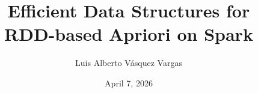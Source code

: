 
\def\MyTitle{Efficient Data Structures for \\ \small RDD-based Apriori on Spark}
\def\MyShortTitle{Apriori on Spark}
\def\MyAuthor{Luis Alberto Vásquez Vargas}
\def\MyShortAuthor{Luis Vásquez}
\def\MyInstitute{IC -- UNICAMP}
\def\MyEmail{l322989@dac.unicamp.br}
\def\MyDate{April 7, 2026}

\title[\MyShortTitle]{\MyTitle}
\author[\MyShortAuthor]{\MyAuthor}
\institute{\MyInstitute}
\date{\MyDate}

\usepackage[english]{babel}
\usepackage[utf8]{inputenc}
\usepackage[T1]{fontenc}
\usepackage{beramono}
\usepackage{amsmath, amsfonts, amssymb}
\usepackage{chemfig}
\usepackage[version=3]{mhchem}
\usepackage{tikz}
\usetikzlibrary{positioning, arrows.meta}
\usepackage{fontawesome}
\usepackage{booktabs}
\usepackage{tabularx}
\usepackage{pifont}
\usepackage{forest}
\usepackage[table, dvipsnames]{xcolor}
\usepackage{etoolbox}

\graphicspath{ {img/} }


\hypersetup{
    colorlinks=true,
    citecolor=SecondaryColor,
    linkcolor=PrimaryColor, 
    urlcolor=AccentColor
}

\makeatletter
\patchcmd{\beamer@sectionintoc}{\vskip1.5em}{\vskip1.0em}{}{}
\makeatother

